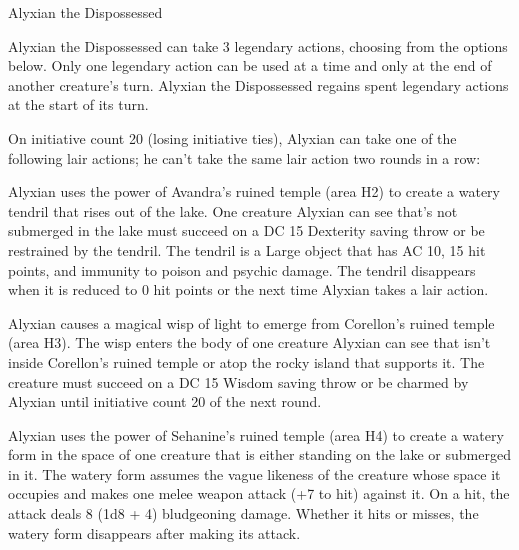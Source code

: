 \documentclass[10pt,a4paper,twoside,twocolumn,openany,nodeprecatedcode]{dndbook}
\begin{document}
\begin{DndMonster}[float=ht]{Alyxian the Dispossessed}
\par
{}
Alyxian the Dispossessed can take 3 legendary actions, choosing from the options below. Only one legendary action can be used at a time and only at the end of another creature's turn. Alyxian the Dispossessed regains spent legendary actions at the start of its turn.

\begin{DndMonsterLegendaryActions}
\end{DndMonsterLegendaryActions}
\par {}
On initiative count 20 (losing initiative ties), Alyxian can take one of the following lair actions; he can't take the same lair action two rounds in a row:


\begin{description}[nolistsep]
\item[Avandra's Grasp]
Alyxian uses the power of Avandra's ruined temple (area H2) to create a watery tendril that rises out of the lake. One creature Alyxian can see that's not submerged in the lake must succeed on a DC 15 Dexterity saving throw or be restrained by the tendril. The tendril is a Large object that has AC 10, 15 hit points, and immunity to poison and psychic damage. The tendril disappears when it is reduced to 0 hit points or the next time Alyxian takes a lair action.

\item[Corellon's Charm]
Alyxian causes a magical wisp of light to emerge from Corellon's ruined temple (area H3). The wisp enters the body of one creature Alyxian can see that isn't inside Corellon's ruined temple or atop the rocky island that supports it. The creature must succeed on a DC 15 Wisdom saving throw or be charmed by Alyxian until initiative count 20 of the next round.

\item[Sehanine's Torment]
Alyxian uses the power of Sehanine's ruined temple (area H4) to create a watery form in the space of one creature that is either standing on the lake or submerged in it. The watery form assumes the vague likeness of the creature whose space it occupies and makes one melee weapon attack (+7 to hit) against it. On a hit, the attack deals 8 (1d8 + 4) bludgeoning damage. Whether it hits or misses, the watery form disappears after making its attack.


\end{description}
\end{DndMonster}
\end{document}
